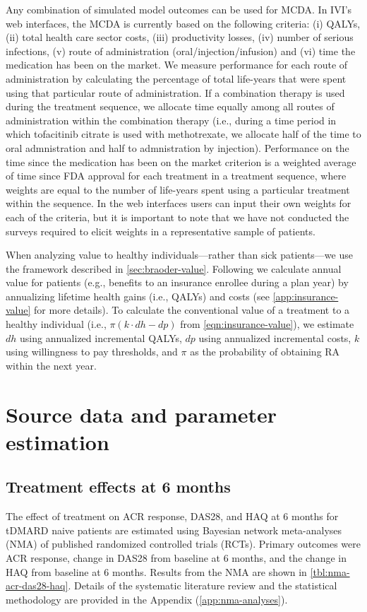 \documentclass[11pt,final,fleqn]{article}
\theoremstyle{plain}
\begin{document}
Any combination of simulated model outcomes can be used for MCDA. In IVI's web interfaces, the MCDA is currently based on the following criteria: (i) QALYs, (ii) total health care sector costs, (iii) productivity losses, (iv) number of serious infections, (v) route of administration (oral/injection/infusion) and (vi) time the medication has been on the market. We measure performance for each route of administration by calculating the percentage of total life-years that were spent using that particular route of administration. If a combination therapy is used during the treatment sequence, we allocate time equally among all routes of administration within the combination therapy (i.e., during a time period in which tofacitinib citrate is used with methotrexate, we allocate half of the time to oral admnistration and half to admnistration by injection). Performance on the time since the medication has been on the market criterion is a weighted average of time since FDA approval for each treatment in a treatment sequence, where weights are equal to the number of life-years spent using a particular treatment within the sequence. In the web interfaces users can input their own weights for each of the criteria, but it is important to note that we have not conducted the surveys required to elicit weights in a representative sample of patients. 

When analyzing value to healthy individuals---rather than sick patients---we use the framework described in \autoref{sec:braoder-value}. Following \citet{lakdawalla2015insurance} we calculate annual value for patients (e.g., benefits to an insurance enrollee during a plan year) by annualizing lifetime health gains (i.e., QALYs) and costs (see \autoref{app:insurance-value} for more details). To calculate the conventional value of a treatment to a healthy individual (i.e., $\pi( k \cdot dh - dp)$ from \autoref{eqn:insurance-value}), we estimate $dh$ using annualized incremental QALYs, $dp$ using annualized incremental costs, $k$ using willingness to pay thresholds, and $\pi$ as the probability of obtaining RA within the next year.  

\section{Source data and parameter estimation}\label{sec:data-parameters}

\subsection{Treatment effects at 6 months}\label{nma-parameters}
The effect of treatment on ACR response, DAS28, and HAQ at 6 months for tDMARD naive patients are estimated using Bayesian network meta-analyses (NMA) of published randomized controlled trials (RCTs). Primary outcomes were ACR response, change in DAS28 from baseline at 6 months, and the change in HAQ from baseline at 6 months. Results from the NMA are shown in \autoref{tbl:nma-acr-das28-haq}. Details of the systematic literature review and the statistical methodology are provided in the Appendix (\autoref{app:nma-analyses}).
\end{document}
